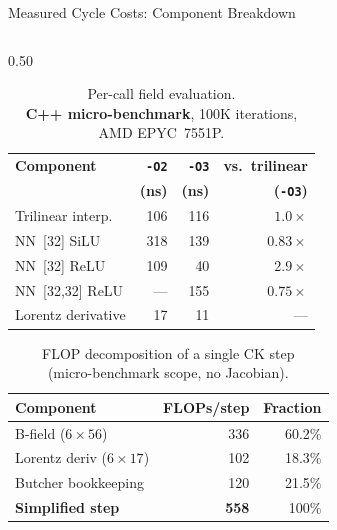 \documentclass[aspectratio=169, 11pt]{beamer}
\newcommand{\bvec}[1]{\mathbf{#1}}
\begin{document}
\begin{frame}{Measured Cycle Costs: Component Breakdown}

\begin{columns}[T]
\begin{column}{0.50\textwidth}
  \begin{table}
  \centering\scriptsize
  \begin{tabular}{@{} l r r r @{}}
    \toprule
    \textbf{Component} & \textbf{\texttt{-O2}} & \textbf{\texttt{-O3}} &
      \textbf{vs.\ trilinear} \\
    & \textbf{(ns)} & \textbf{(ns)} & \textbf{(\texttt{-O3})} \\
    \midrule
    Trilinear interp.   & 106 & 116 & $1.0\times$ \\
    NN~[32] SiLU        & 318 & 139 & $0.83\times$ \\
    NN~[32] ReLU        & 109 & 40  & $\bvec{2.9\times}$ \\
    NN~[32,32] ReLU     & ---  & 155 & $0.75\times$ \\
    Lorentz derivative  & 17  & 11  & --- \\
    \bottomrule
  \end{tabular}
  \caption*{\scriptsize Per-call field evaluation.\\
            {\color{darkgray}\textbf{C++ micro-benchmark}, 100K iterations,
            AMD EPYC~7551P.}}
  \end{table}

  \vspace{2pt}
  \begin{table}
  \centering\scriptsize
  \begin{tabular}{@{} l r r @{}}
    \toprule
    \textbf{Component} & \textbf{FLOPs/step} & \textbf{Fraction} \\
    \midrule
    B-field ($6\times56$)     & 336  & 60.2\% \\
    Lorentz deriv ($6\times17$)& 102 & 18.3\% \\
    Butcher bookkeeping       & 120  & 21.5\% \\
    \midrule
    \textbf{Simplified step}  & \textbf{558} & 100\% \\
    \bottomrule
  \end{tabular}
  \caption*{\scriptsize FLOP decomposition of a single CK step\\
            (micro-benchmark scope, no Jacobian).}
  \end{table}
\end{column}


\end{columns}
\end{frame}
\end{document}
